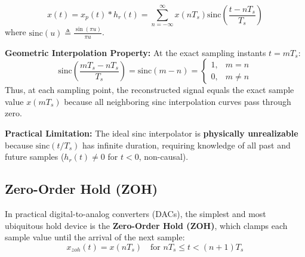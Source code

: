 \documentclass[12pt,a4paper]{article}
\begin{document}
\begin{tcolorbox}[formulabox, title={\textbf{Whittaker-Shannon Cardinal Reconstruction Formula}}]
\begin{equation}
  x(t) = x_p(t) * h_r(t) = \sum_{n=-\infty}^{\infty} x(n T_s) \text{sinc}\left(\frac{t - n T_s}{T_s}\right)
\end{equation}
where $\text{sinc}(u) \triangleq \frac{\sin(\pi u)}{\pi u}$.
\end{tcolorbox}

\textbf{Geometric Interpolation Property:}
At the exact sampling instants $t = m T_s$:
\begin{equation}
  \text{sinc}\left(\frac{m T_s - n T_s}{T_s}\right) = \text{sinc}(m - n) = \begin{cases} 1, & m = n \\ 0, & m \ne n \end{cases}
\end{equation}
Thus, at each sampling point, the reconstructed signal equals the exact sample value $x(m T_s)$ because all neighboring sinc interpolation curves pass through zero.

\textbf{Practical Limitation:} The ideal sinc interpolator is \textbf{physically unrealizable} because $\text{sinc}(t/T_s)$ has infinite duration, requiring knowledge of all past and future samples ($h_r(t) \ne 0$ for $t < 0$, non-causal).

\subsection{Zero-Order Hold (ZOH)}
In practical digital-to-analog converters (DACs), the simplest and most ubiquitous hold device is the \textbf{Zero-Order Hold (ZOH)}, which clamps each sample value until the arrival of the next sample:
\begin{equation}
  x_{zoh}(t) = x(n T_s) \quad \text{for } n T_s \le t < (n+1)T_s
\end{equation}
\end{document}
